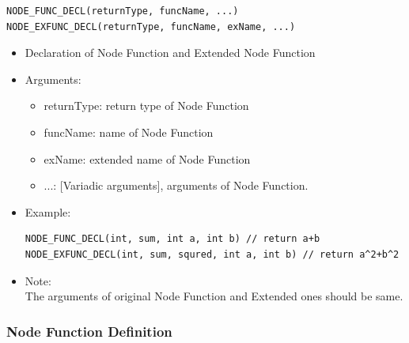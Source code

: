 \documentclass[a4paper,10pt]{book}
\begin{document}
\begin{mdframed}
\begin{verbatim}
NODE_FUNC_DECL(returnType, funcName, ...)
NODE_EXFUNC_DECL(returnType, funcName, exName, ...)
\end{verbatim}
\begin{itemize}
 \item Declaration of Node Function and Extended Node Function
 \item Arguments:
 \begin{itemize}
  \item returnType: return type of Node Function
  \item funcName: name of Node Function
  \item exName: extended name of Node Function
  \item ...: [Variadic arguments], arguments of Node Function.
 \end{itemize}
 \item Example:
 \begin{verbatim}
NODE_FUNC_DECL(int, sum, int a, int b) // return a+b
NODE_EXFUNC_DECL(int, sum, squred, int a, int b) // return a^2+b^2
 \end{verbatim}
 \item Note: \\ The arguments of original Node Function and Extended ones should be same.
\end{itemize}
\end{mdframed}

\subsubsection{Node Function Definition}
\end{document}
